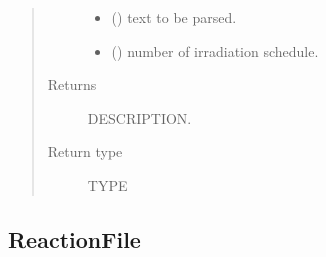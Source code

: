 \documentclass[letterpaper,10pt,english]{sphinxmanual}
\begin{document}
\begin{fulllineitems}
\begin{fulllineitems}
\begin{quote}
\begin{description}
\begin{itemize}
\item {} 
 () \textendash{} text to be parsed.

\item {} 
 () \textendash{} number of irradiation schedule.

\end{itemize}

\item[{Returns}] \leavevmode
DESCRIPTION.

\item[{Return type}] \leavevmode
TYPE

\end{description}\end{quote}

\end{fulllineitems}


\end{fulllineitems}



\subsection{ReactionFile}
\label{\detokenize{api/inputgeneration:reactionfile}}\label{\detokenize{api/inputgeneration:reacfileob}}
\end{document}
